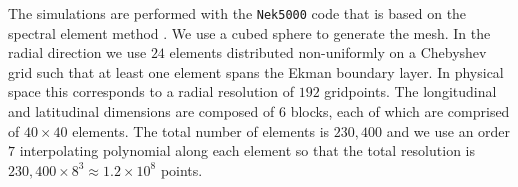 The simulations are performed with the \texttt{Nek5000} code \citep{nek5000} that is based on the spectral element method \citep{aP84}. We use a cubed sphere to generate the mesh. In the radial direction we use $24$ elements distributed non-uniformly on a Chebyshev grid such that at least one element spans the Ekman boundary layer. In physical space this corresponds to a radial resolution of $192$ gridpoints.
The longitudinal and latitudinal dimensions are composed of $6$ blocks, each of which are comprised of $40\times 40$ elements. 
The total number of elements is $230,400$ and we use an order $7$ interpolating polynomial along each element so that the total resolution is $230,400\times8^3 \approx 1.2\times10^{8}$ points. 

